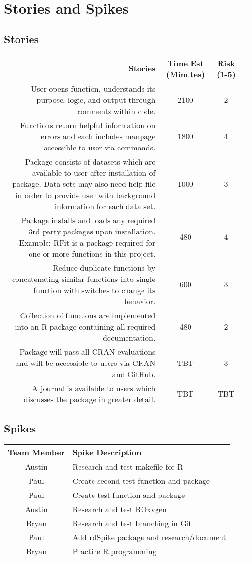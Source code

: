 \documentclass[12pt]{article}
\begin{document}
\section{Stories and Spikes}
\subsection*{Stories}
\begin{tabularx}{\linewidth}{| @{} R| *{3}{S|} @{}|}
\hline
\textbf{Stories} & \textbf{Time Est (Minutes)} & \textbf{Risk (1-5)}\\
\hline
User opens function, understands its purpose, logic, and output through comments within code. & 2100 & 2\\
\hline
Functions return helpful information on errors and each includes manpage accessible to user via commands. & 1800 & 4\\
\hline
Package consists of datasets which are available to user after installation of package. Data sets may also need help file in order to provide user with background information for each data set. & 1000 & 3\\
\hline
Package installs and loads any required 3rd party packages upon installation. Example: RFit is a package required for one or more functions in this project. & 480 & 4\\
\hline
Reduce duplicate functions by concatenating similar functions into single function with switches to change its behavior. & 600 & 3\\
\hline
Collection of functions are implemented into an R package containing all required documentation. & 480 & 2\\
\hline
Package will pass all CRAN evaluations and will be accessible to users via CRAN and GitHub. & TBT & 3\\
\hline
A journal is available to users which discusses the package in greater detail. & TBT & TBT\\
\hline
\end{tabularx}

\subsection*{Spikes}
\begin{tabular}{|c|l|}
\hline
\textbf{Team Member} & \textbf{Spike Description}\\
\hline
Austin & Research and test makefile for R\\
\hline
Paul & Create second test function and package\\
\hline
Paul & Create test function and package\\
\hline
Austin & Research and test ROxygen\\
\hline
Bryan & Research and test branching in Git\\
\hline
Paul & Add rdSpike package and research/document\\
\hline
Bryan & Practice R programming\\
\hline
\end{tabular}
\end{document}
